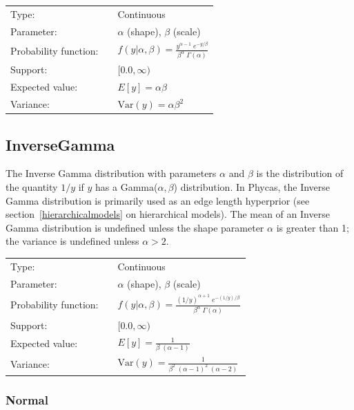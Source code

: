\documentclass[10pt]{article}
\newcommand{\Var}{\mbox{Var}}
\begin{document}
\begin{tabular}{lcl}
Type:                 & & Continuous \\
Parameter:            & & $\alpha$ (shape), $\beta$ (scale)    \\
Probability function: & & $f(y|\alpha,\beta) = \frac{y^{\alpha - 1} \; e^{-y/\beta}}{\beta^{\alpha} \; \Gamma(\alpha)}$ \\
Support:              & & $[0.0,\infty)$     \\
Expected value:       & & $E[y] = \alpha \beta$ \\
Variance:             & & $\Var(y) = \alpha \beta^2$ 
\end{tabular}

\subsection{InverseGamma}\label{inversegammadist}

The Inverse Gamma distribution with parameters $\alpha$ and $\beta$ is the distribution of the quantity $1/y$ if $y$ has a Gamma($\alpha,\beta$) distribution. In Phycas, the Inverse Gamma distribution is primarily used as an edge length hyperprior (see section~\ref{hierarchicalmodels} on hierarchical models). The mean of an Inverse Gamma distribution is undefined unless the shape parameter $\alpha$ is greater than 1; the variance is undefined unless $\alpha > 2$.

\begin{tabular}{lcl}
Type:                 & & Continuous \\
Parameter:            & & $\alpha$ (shape), $\beta$ (scale)    \\
Probability function: & & $f(y|\alpha,\beta) = \frac{(1/y)^{\alpha + 1} \; e^{-(1/y)/\beta}}{\beta^{\alpha} \; \Gamma(\alpha)}$ \\
Support:              & & $[0.0,\infty)$     \\
Expected value:       & & $E[y] = \frac{1}{\beta \;(\alpha-1)}$ \\
Variance:             & & $\Var(y) = \frac{1}{\beta^2 \; (\alpha-1)^2 \; (\alpha-2)}$ 
\end{tabular}

\subsubsection{Normal}\label{normaldist}
\end{document}

